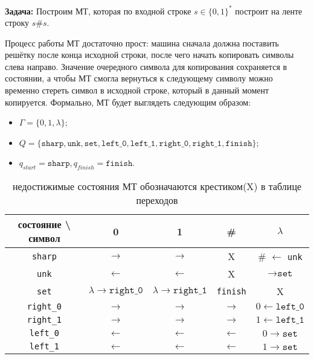\documentclass[
    11pt,
    a4paper
]{article}
\theoremstyle{definition}
\begin{document}
\textbf{Задача:} Построим МТ, которая по входной строке $s \in \{0, 1\}^*$ построит на ленте строку $s\#s$.

Процесс работы МТ достаточно прост: машина сначала должна поставить решётку после конца исходной строки, после чего начать копировать символы слева направо. Значение очередного символа для копирования сохраняется в состоянии, а чтобы МТ смогла вернуться к следующему символу можно временно стереть символ в исходной строке, который в данный момент копируется. Формально, МТ будет выглядеть следующим образом:

\begin{itemize}
\item $\Gamma = \{0, 1, \lambda\}$;
\item $Q = \{\texttt{sharp}, \texttt{unk}, \texttt{set}, \texttt{left\_0}, \texttt{left\_1}, \texttt{right\_0}, \texttt{right\_1}, \texttt{finish}\}$;
\item $q_{start} = \texttt{sharp}, q_{finish} = \texttt{finish}$.
\end{itemize}

\begin{center}
\begin{table}[H]
\centering
\begin{tabular}{ | c | c | c | c | c | }
\hline
состояние \textbackslash{ }символ & 0 & 1 & \# & $\lambda$ \\ 
 \hline
 \texttt{sharp} & $\rightarrow$ & $\rightarrow$ & X & \# $\leftarrow$ \texttt{unk} \\  
 \hline
 \texttt{unk} & $\leftarrow$ & $\leftarrow$ & X & $\rightarrow \texttt{set}$\\
 \hline
 \texttt{set} & $\lambda \rightarrow \texttt{right\_0}$ & $\lambda \rightarrow \texttt{right\_1}$ & \texttt{finish} & X\\
 \hline
 \texttt{right\_0} & $\rightarrow$ & $\rightarrow$ & $\rightarrow$ & $0 \leftarrow \texttt{left\_0}$\\
 \hline
 \texttt{right\_1} & $\rightarrow$ & $\rightarrow$ & $\rightarrow$ & $1 \leftarrow \texttt{left\_1}$\\
 \hline
 \texttt{left\_0} & $\leftarrow$ & $\leftarrow$ & $\leftarrow$ & $0 \rightarrow \texttt{set}$\\
 \hline
 \texttt{left\_1} & $\leftarrow$ & $\leftarrow$ & $\leftarrow$ & $1 \rightarrow \texttt{set}$\\
 \hline
\end{tabular}
\caption{недостижимые состояния МТ обозначаются крестиком(X) в таблице переходов}
\end{table}
\end{center}
\end{document}
